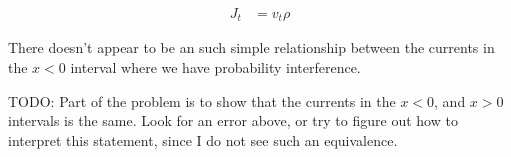 \documentclass{article}
\begin{document}
\begin{align*}
J_t &= v_t \rho
\end{align*}

There doesn't appear to be an such simple relationship between the currents
in the $x<0$ interval where we have probability interference.

TODO: Part of the problem is to show that the currents in the $x<0$, and $x>0$
intervals is the same.  Look for an error above, or try to figure out how to
interpret this statement, since I do not see such an equivalence.

%
%
%
%
%
%
%
%
%
%
%
%
%
%
%
%
%
\end{document}
